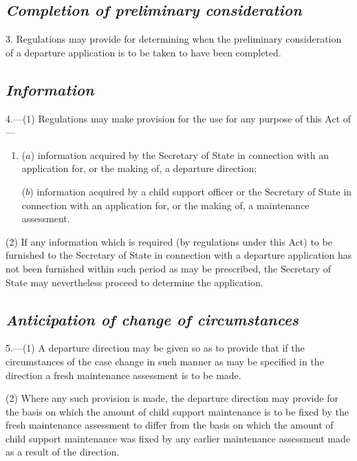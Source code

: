 \documentclass[12pt,a4paper]{article}
\begin{document}

\subsection*{\itshape Completion of preliminary consideration}

3. Regulations may provide for determining when the preliminary consideration of a departure application is to be taken to have been completed.

\subsection*{\itshape Information}

4.---(1) Regulations may make provision for the use for any purpose of this Act of—
\begin{enumerate}\item[]
($a$) information acquired by the Secretary of State in connection with an application for, or the making of, a departure direction;

($b$) information acquired by 
a child support officer or  %
the Secretary of State in connection with an application for, or the making of, a maintenance assessment.
\end{enumerate}

(2) If any information which is required (by regulations under this Act) to be furnished to the Secretary of State in connection with a departure application has not been furnished within such period as may be prescribed, the Secretary of State may nevertheless proceed to determine the application.


\subsection*{\itshape Anticipation of change of circumstances}

5.---(1) A departure direction may be given so as to provide that if the circumstances of the case change in such manner as may be specified in the direction a fresh maintenance assessment is to be made.

(2) Where any such provision is made, the departure direction may provide for the basis on which the amount of child support maintenance is to be fixed by the fresh maintenance assessment to differ from the basis on which the amount of child support maintenance was fixed by any earlier maintenance assessment made as a result of the direction.
\end{document}
